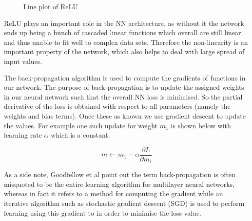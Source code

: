 \begin{figure}[!ht]\centering
    \caption{Line plot of ReLU}\label{Ch2Fig:11}
\end{figure}


ReLU plays an important role in the NN architecture, as without it the network ends up being a bunch of cascaded linear functions which overall are still linear and thus unable to fit well to complex data sets. Therefore the non-linearity is an important property of the network, which also helps to deal with large spread of input values.

The back-propagation algorithm is used to compute the gradients of functions in our network. The purpose of back-propagation is to update the assigned weights in our neural network such that the overall NN loss is minimised. So the partial derivative of the loss is obtained with respect to all parameters (namely the weights and bias terms). Once these as known we use gradient descent to update the values. For example one such update for weight $m_1$ is shown below with learning rate $\alpha$ which is a constant.

\begin{equation}
    m \leftarrow m_1-\alpha \dfrac{\partial L}{\partial m_i}
\end{equation}

As a side note, Goodfellow et al \autocite{rosenblatt1958perceptron} point out the term back-propagation is often misquoted to be the entire learning algorithm for multilayer neural networks, whereas in fact it refers to a method for computing the gradient while an iterative algorithm such as stochastic gradient descent (SGD) is used to perform learning using this gradient to in order to minimise the loss value.